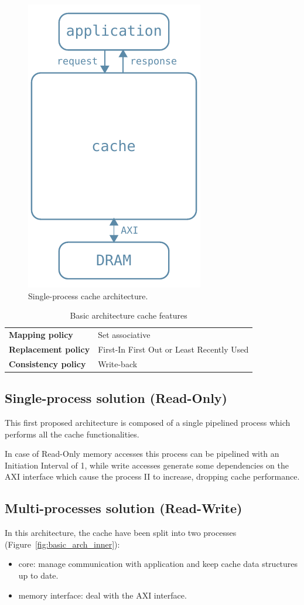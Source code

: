 \documentclass[11pt,a4paper]{memoir}
\begin{document}
\begin{figure}
	\centering
	\includegraphics[width=.3\textwidth]{basic_arch}
	\caption{Single-process cache architecture.}
	\label{fig:basic_arch}
\end{figure}

\begin{table}
	\begin{center}
		\begin{tabular}{ll}
			\hline
			\rowcolor{gray!25}
			\textbf{Mapping policy} & Set associative \\
			\textbf{Replacement policy} & First-In First Out or
				Least Recently Used \\
			\rowcolor{gray!25}
			\textbf{Consistency policy} & Write-back \\
			\hline
		\end{tabular}
	\end{center}
	\caption{Basic architecture cache features}
\end{table}

\subsection{Single-process solution (Read-Only)}
This first proposed architecture is composed of a single pipelined process
which performs all the cache functionalities.

In case of Read-Only memory accesses this process can be pipelined with an
Initiation Interval of 1, while write accesses generate some dependencies on the
AXI interface which cause the process II to increase, dropping cache
performance.

\subsection{Multi-processes solution (Read-Write)}
In this architecture, the cache have been split into two processes
(Figure~\ref{fig:basic_arch_inner}):
\begin{itemize}
	\item core: manage communication with application and keep cache data
		structures up to date.
	\item memory interface: deal with the AXI interface.
\end{itemize}
\end{document}
